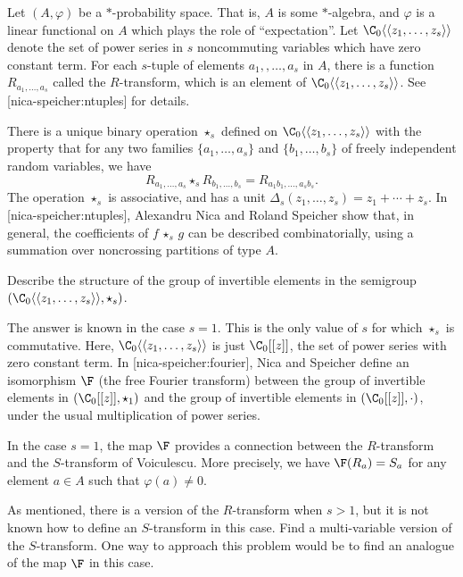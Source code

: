 \documentclass[12pt,letterpaper, reqno]{amsart}
\begin{document}
\begin{problemblock}
Let $( A,\varphi)$ be a $*$-probability space. That is, $ A$ is some $*$-algebra, and $\varphi$ is a linear functional on $ A$ which plays the role of ``expectation''. Let $\C_0\langle\langle z_1,\ldots,z_s\rangle\rangle$ denote the set of power series in $s$ noncommuting variables which have zero constant term. For each $s$-tuple of elements $a_1,,\ldots,a_s$ in $ A$, there is a function $R_{a_1,\ldots,a_s}$ called the  $R$-transform, which is an element of $\C_0\langle\langle z_1,\ldots,z_s\rangle\rangle$. See [nica-speicher:ntuples] for details.

There is a unique binary operation $\star_s$ defined on $\C_0\langle\langle z_1,\ldots,z_s\rangle\rangle$ with the property that for any two families $\{a_1,\ldots,a_s\}$ and $\{b_1,\ldots,b_s\}$ of freely independent random variables, we have
$$
R_{a_1,\ldots,a_s} \star_s R_{b_1,\ldots,b_s} = R_{a_1 b_1,\ldots,a_s b_s}.
$$
The operation $\star_s$ is associative, and has a unit $\Delta_s(z_1,\ldots,z_s)= z_1+\cdots +z_s$. In [nica-speicher:ntuples], Alexandru Nica and Roland Speicher show that, in general, the coefficients of $f\,\star_s \,g$ can be described combinatorially, using a summation over noncrossing partitions of type $A$.


\begin{problem}[5.2]
Describe the structure of the group of
invertible elements in the
semigroup
$( \C_0\langle\langle z_1,\ldots,z_s\rangle\rangle,\star_s )$.
\end{problem}

\begin{remark}
The answer is known in the case $s=1$. This is the only value of $s$
for which $\star_s$ is commutative. Here, $\C_0\langle\langle
z_1,\ldots,z_s\rangle\rangle$ is just $\C_0[[z]]$, the set of power
series with zero constant term. In [nica-speicher:fourier], Nica and
Speicher define an isomorphism $\F$ (the free Fourier transform)
between the group of invertible elements in $(\C_0[[z]], \star_1)$
and the group of invertible elements in $(\C_0[[z]], \cdot)$, under the
usual multiplication of power series.
\end{remark}

\begin{remark}
In the case $s=1$, the map $\F$ provides a connection between the $R$-transform and the $S$-transform of Voiculescu. More precisely, we have $\F(R_a)=S_a$ for any element $a\in A$ such that $\varphi(a)\neq 0$.

As mentioned, there is a version of the $R$-transform when $s>1$, but it is not known how to define an $S$-transform in this case. Find a multi-variable version of the $S$-transform. One way to approach this problem would be to find an analogue of the map $\F$ in this case.
\end{remark}

\end{problemblock}
\end{document}
